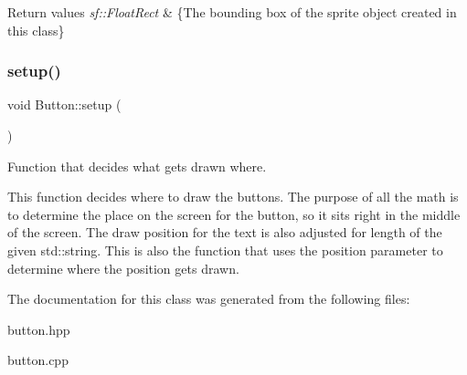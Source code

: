 \begin{DoxyRetVals}{Return values}
{\em sf\+::\+Float\+Rect} & \{The bounding box of the sprite object created in this class\} \\
\hline
\end{DoxyRetVals}
\mbox{\label{class_button_aaf14334dd0ac6a9c286aac71a765caa2}} 
\subsubsection{\texorpdfstring{setup()}{setup()}}
{\footnotesize\ttfamily void Button\+::setup (\begin{DoxyParamCaption}{ }\end{DoxyParamCaption})}



Function that decides what gets drawn where. 

This function decides where to draw the buttons. The purpose of all the math is to determine the place on the screen for the button, so it sits right in the middle of the screen. The draw position for the text is also adjusted for length of the given std\+::string. This is also the function that uses the position parameter to determine where the position gets drawn. 

The documentation for this class was generated from the following files\+:\begin{DoxyCompactItemize}
\item 
button.\+hpp\item 
button.\+cpp\end{DoxyCompactItemize}
